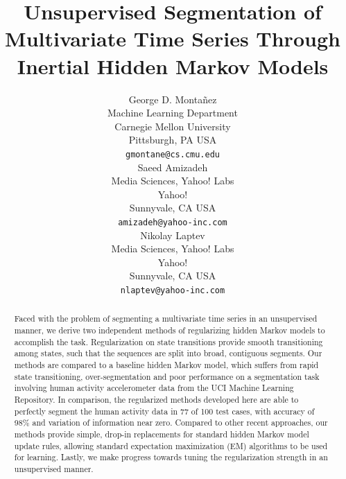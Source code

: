 \documentclass[12pt]{article}
\begin{document}
\title{Unsupervised Segmentation of Multivariate Time Series Through Inertial Hidden Markov Models}

\author{
George D. Monta\~nez \\
Machine Learning Department\\
Carnegie Mellon University\\
Pittsburgh, PA USA\\
\texttt{gmontane@cs.cmu.edu} \\
\And    
Saeed Amizadeh\\
Media Sciences, Yahoo! Labs\\
Yahoo!\\
Sunnyvale, CA USA\\
\texttt{amizadeh@yahoo-inc.com} \\
\And
Nikolay Laptev \\
Media Sciences, Yahoo! Labs\\
Yahoo!\\
Sunnyvale, CA USA\\
\texttt{nlaptev@yahoo-inc.com} \\
}

\maketitle

\begin{abstract}
    Faced with the problem of segmenting a multivariate time series in an unsupervised manner, we derive two independent methods of regularizing hidden Markov models to accomplish the task. Regularization on state transitions provide smooth transitioning among states, such that the sequences are split into broad, contiguous segments. Our methods are compared to a baseline hidden Markov model, which suffers from rapid state transitioning, over-segmentation and poor performance on a segmentation task involving human activity accelerometer data from the UCI Machine Learning Repository. In comparison, the regularized methods developed here are able to perfectly segment the human activity data in 77 of 100 test cases, with accuracy of 98\% and variation of information near zero. Compared to other recent approaches, our methods provide simple, drop-in replacements for standard hidden Markov model update rules, allowing standard expectation maximization (EM) algorithms to be used for learning. Lastly, we make progress towards tuning the regularization strength in an unsupervised manner.
\end{abstract}
\end{document}
